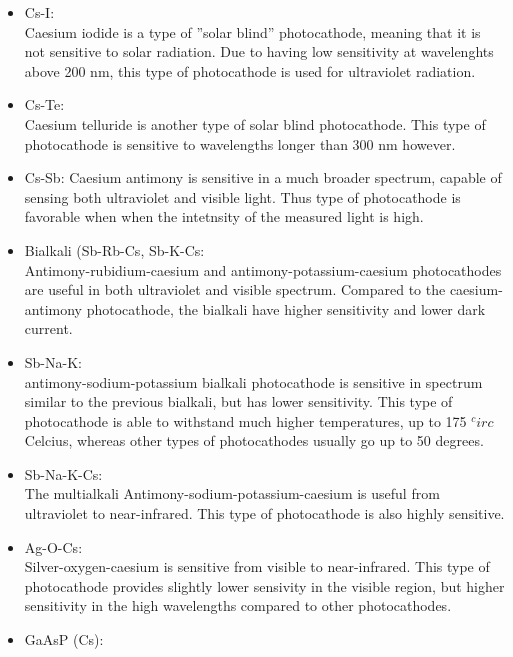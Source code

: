 \begin{itemize}
\item Cs-I:\\
Caesium iodide is a type of ”solar blind” photocathode, meaning that it is not sensitive to solar radiation. Due to having low sensitivity at wavelenghts above 200 nm, this type of photocathode is used for ultraviolet radiation. 
\\
\item Cs-Te:\\
Caesium telluride is another type of solar blind photocathode. This type of photocathode is sensitive to wavelengths longer than 300 nm however.
\\
\item Cs-Sb:
Caesium antimony is sensitive in a much broader spectrum, capable of sensing both ultraviolet and visible light. Thus type of photocathode is favorable when when the intetnsity of the measured light is high.
\\
\item Bialkali (Sb-Rb-Cs, Sb-K-Cs:\\ 
Antimony-rubidium-caesium and antimony-potassium-caesium photocathodes are useful in both ultraviolet and visible spectrum. Compared to the caesium-antimony photocathode, the bialkali have higher sensitivity and lower dark current.
\\
\item Sb-Na-K:\\
antimony-sodium-potassium bialkali photocathode is sensitive in spectrum similar to the previous bialkali, but has lower sensitivity. This type of photocathode is able to withstand much higher temperatures, up to 175 $^circ$ Celcius, whereas other types of photocathodes usually go up to 50 degrees.
\\
\item Sb-Na-K-Cs:\\
The multialkali Antimony-sodium-potassium-caesium is useful from ultraviolet to near-infrared. This type of photocathode is also highly sensitive.
\\
\item Ag-O-Cs:\\ 
Silver-oxygen-caesium is sensitive from visible to near-infrared. This type of photocathode provides slightly lower sensivity in the visible region, but higher sensitivity in the high wavelengths compared to other photocathodes.
\\
\item GaAsP (Cs):\\

\end{itemize}
